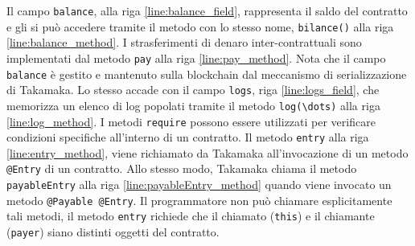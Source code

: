 Il campo \lstinline|balance|, alla riga \ref{line:balance_field}, rappresenta il saldo del contratto e gli si può accedere tramite il metodo con lo stesso nome, \lstinline|bilance()| alla riga \ref{line:balance_method}. I strasferimenti di denaro inter-contrattuali sono implementati dal metodo \lstinline|pay| alla riga \ref{line:pay_method}. Nota che il campo \lstinline|balance| è gestito e mantenuto sulla blockchain dal meccanismo di serializzazione di Takamaka. Lo stesso accade con il campo \lstinline|logs|, riga \ref{line:logs_field}, che memorizza un elenco di log popolati tramite il metodo \lstinline|log(\dots)| alla riga \ref{line:log_method}. I metodi \lstinline|require| possono essere utilizzati per verificare condizioni specifiche all'interno di un contratto. Il metodo \lstinline|entry| alla riga \ref{line:entry_method}, viene richiamato da Takamaka all'invocazione di un metodo \lstinline|@Entry| di un contratto. Allo stesso modo, Takamaka chiama il metodo \lstinline|payableEntry| alla riga \ref{line:payableEntry_method} quando viene invocato un metodo \lstinline|@Payable @Entry|. Il programmatore non può chiamare esplicitamente tali metodi, il metodo \lstinline|entry| richiede che il chiamato (\lstinline|this|) e il chiamante (\lstinline|payer|) siano distinti oggetti del contratto. 

